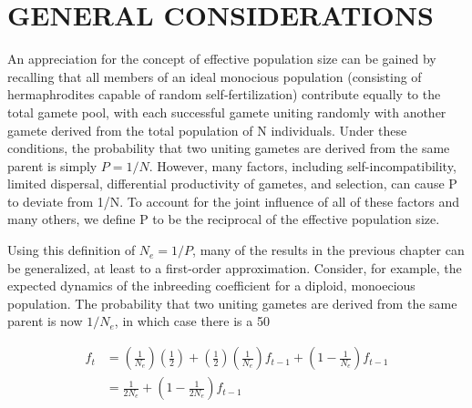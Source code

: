 \documentclass{article}
\begin{document}
\section{GENERAL CONSIDERATIONS}
An appreciation for the concept of effective population size can be gained by recalling that all members of an ideal monocious population (consisting of hermaphrodites capable of random self-fertilization) contribute equally to the total gamete pool, with each successful gamete uniting randomly with another gamete derived from the total population of N individuals. Under these conditions, the probability that two uniting gametes are derived from the same parent is simply  $ P = 1/N $. However, many factors, including self-incompatibility, limited dispersal, differential productivity of gametes, and selection, can cause P to deviate from 1/N. To account for the joint influence of all of these factors and many others, we define P to be the reciprocal of the effective population size.

Using this definition of  $ N_e = 1/P $, many of the results in the previous chapter can be generalized, at least to a first-order approximation. Consider, for example, the expected dynamics of the inbreeding coefficient for a diploid, monoecious population. The probability that two uniting gametes are derived from the same parent is now  $ 1/N_e $, in which case there is a 50%

\begin{equation}
\begin{aligned}f_{t}&=\left(\frac{1}{N_{e}}\right)\left(\frac{1}{2}\right)+\left(\frac{1}{2}\right)\left(\frac{1}{N_{e}}\right)f_{t-1}+\left(1-\frac{1}{N_{e}}\right)f_{t-1}\\&=\frac{1}{2N_{e}}+\left(1-\frac{1}{2N_{e}}\right)f_{t-1}\end{aligned}
\tag{3.1}
\label{eq:3_1}
\end{equation}
\end{document}
